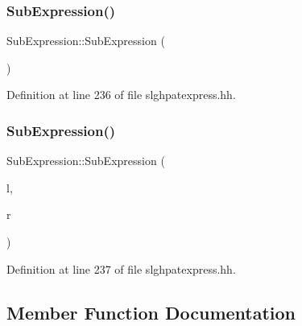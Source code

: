 \subsubsection{\texorpdfstring{SubExpression()}{SubExpression()}\hspace{0.1cm}{\footnotesize\ttfamily [1/2]}}
{\footnotesize\ttfamily Sub\+Expression\+::\+Sub\+Expression (\begin{DoxyParamCaption}\item[{void}]{ }\end{DoxyParamCaption})\hspace{0.3cm}{\ttfamily [inline]}}



Definition at line 236 of file slghpatexpress.\+hh.

\mbox{\label{class_sub_expression_a7d06a9320ed2c3a70277f71763852c0d}} 
\subsubsection{\texorpdfstring{SubExpression()}{SubExpression()}\hspace{0.1cm}{\footnotesize\ttfamily [2/2]}}
{\footnotesize\ttfamily Sub\+Expression\+::\+Sub\+Expression (\begin{DoxyParamCaption}\item[{\mbox{\hyperlink{class_pattern_expression}{Pattern\+Expression}} $\ast$}]{l,  }\item[{\mbox{\hyperlink{class_pattern_expression}{Pattern\+Expression}} $\ast$}]{r }\end{DoxyParamCaption})\hspace{0.3cm}{\ttfamily [inline]}}



Definition at line 237 of file slghpatexpress.\+hh.



\subsection{Member Function Documentation}
\mbox{\label{class_sub_expression_a56c441953eedc3a8f55d3b716b7ed7f5}} 
